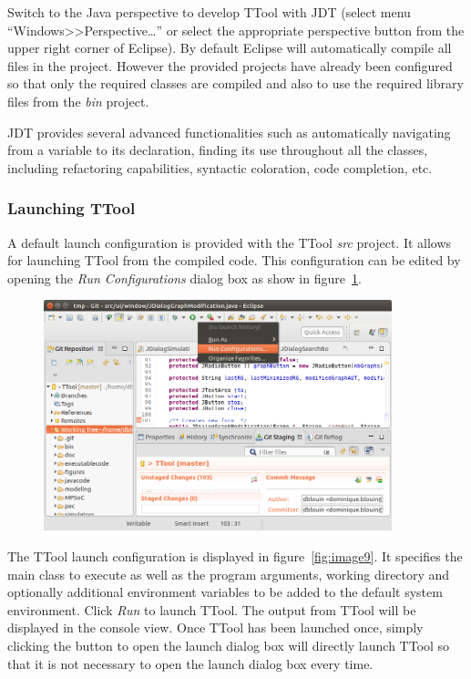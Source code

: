 \documentclass[12pt]{article}
\begin{document}
Switch to the Java perspective to develop TTool with JDT (select menu
``Windows>>Perspective\ldots'' or select the appropriate perspective button from
the upper right corner of Eclipse). By default Eclipse will automatically
compile all files in the project. However the provided projects have already
been configured so that only the required classes are compiled and also to use
the required library files from the \textit{bin} project.

JDT provides several advanced functionalities such as automatically navigating
from a variable to its declaration, finding its use throughout all the classes,
including refactoring capabilities, syntactic coloration, code completion, etc.

\subsubsection{Launching TTool}
\label{sec:launch}

A default launch configuration is provided with the TTool \textit{src} project.
It allows for launching TTool from the compiled code. This configuration can be
edited by opening the \textit{Run Configurations} dialog box as show in figure~\ref{fig:image8}.

\begin{figure}[H]
\begin{center}
\includegraphics[width=0.9\textwidth]{images/image8.png}
\end{center}
\caption{}
\label{fig:image8}
\end{figure}

The TTool launch configuration is displayed in figure~\ref{fig:image9}. It
specifies the main class to execute as well as the program arguments, working directory and
optionally additional environment variables to be added to the default system
environment. Click \textit{Run} to launch TTool. The output from TTool will be
displayed in the console view. Once TTool has been launched once, simply
clicking the button to open the launch dialog box will directly launch TTool so
that it is not necessary to open the launch dialog box every time.
\end{document}
